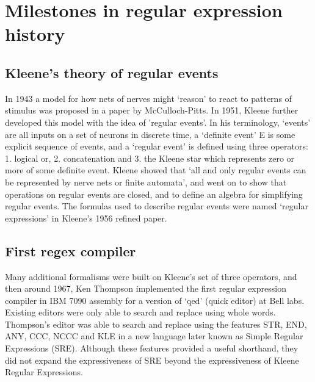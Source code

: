 \section{Milestones in regular expression history}

\subsection{Kleene's theory of regular events}
In 1943 a model for how nets of nerves might `reason' to react to patterns of stimulus was proposed in a paper by McCulloch-Pitts.  In 1951, Kleene further developed this model with the idea of 'regular events'.  In his terminology, `events' are all inputs on a set of neurons in discrete time, a `definite event' E is some explicit sequence of events, and a `regular event' is defined using three operators: 1. logical or, 2. concatenation and 3. the Kleene star which represents zero or more of some definite event.  Kleene showed that `all and only regular events can be represented by nerve nets or finite automata', and went on to show that operations on regular events are closed, and to define an algebra for simplifying regular events.  The formulas used to describe regular events were named `regular expressions' in Kleene's 1956 refined paper.

\subsection{First regex compiler}
Many additional formalisms were built on Kleene's set of three operators, and then around 1967, Ken Thompson implemented the first regular expression compiler in IBM 7090 assembly for a version of `qed' (quick editor) at Bell labs.  Existing editors were only able to search and replace using whole words.  Thompson's editor was able to search and replace using the features STR, END, ANY, CCC, NCCC and KLE in a new language later known as Simple Regular Expressions (SRE).  Although these features provided a useful shorthand, they did not expand the expressiveness of SRE beyond the expressiveness of Kleene Regular Expressions.

